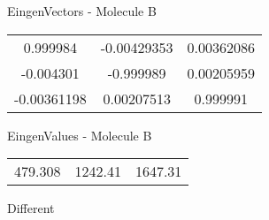 \begin{multicols}{2}
\begin{center}
\vtab
 EingenVectors - Molecule B     \\
\vtab
\begin{tabular}{|c c c|}
0.999984	 & 	-0.00429353	 & 	0.00362086	 \\
-0.004301	 & 	-0.999989	 & 	0.00205959	 \\
-0.00361198	 & 	0.00207513	 & 	0.999991
\end{tabular}

\vtab
 EingenValues - Molecule B     \\
\vtab
\begin{tabular}{|c c c|}
479.308	 & 	1242.41	 & 	1647.31	 \\
\end{tabular}

\end{center}
\end{multicols}
\begin{center}
\vtab
\vtab
\textcolor{NavyBlue}{\Large Different}
\end{center}

 \newpage

